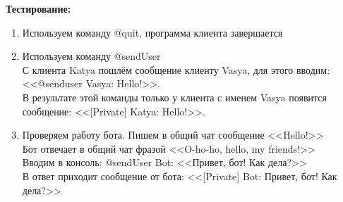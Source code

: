 \documentclass{article}
\begin{document}
	
	\textbf{Тестирование:}
	\begin{enumerate}
		\item Используем команду @quit, программа клиента завершается
		\item Используем команду @sendUser\\
		С клиента Katya пошлём сообщение клиенту Vasya, для этого вводим: <<@senduser Vasya: Hello!>>.\\
		В результате этой команды только у клиента с именем Vasya появится сообщение: <<[Private] Katya: Hello!>>.
		\item Проверяем работу бота. Пишем в общий чат сообщение <<Hello!>>\\
		Бот отвечает в общий чат фразой <<O-ho-ho, hello, my friends!>>\\
		Вводим в консоль: @sendUser Bot: <<Привет, бот! Как дела?>>\\
		В ответ приходит сообщение от бота: <<[Private] Bot: Привет, бот! Как дела?>>
	\end{enumerate}
\end{document}
